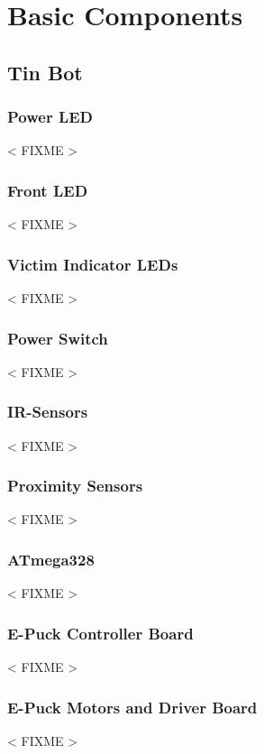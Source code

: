 \documentclass[a4paper,parskip,headheight=38pt]{scrartcl} %
\newcommand{\incomplete}[1]{\textless{} #1 \textgreater{}}
\begin{document}
\section{Basic Components}
\subsection{Tin Bot} %

\subsubsection{Power LED}
\incomplete{FIXME}

\subsubsection{Front LED}
\incomplete{FIXME}

\subsubsection{Victim Indicator LEDs}
\incomplete{FIXME}

\subsubsection{Power Switch}
\incomplete{FIXME}

\subsubsection{IR-Sensors}
\incomplete{FIXME}

\subsubsection{Proximity Sensors}
\incomplete{FIXME}

\subsubsection{ATmega328}
\incomplete{FIXME}

\subsubsection{E-Puck Controller Board}
\incomplete{FIXME}

\subsubsection{E-Puck Motors and Driver Board}
\incomplete{FIXME}
\end{document}
